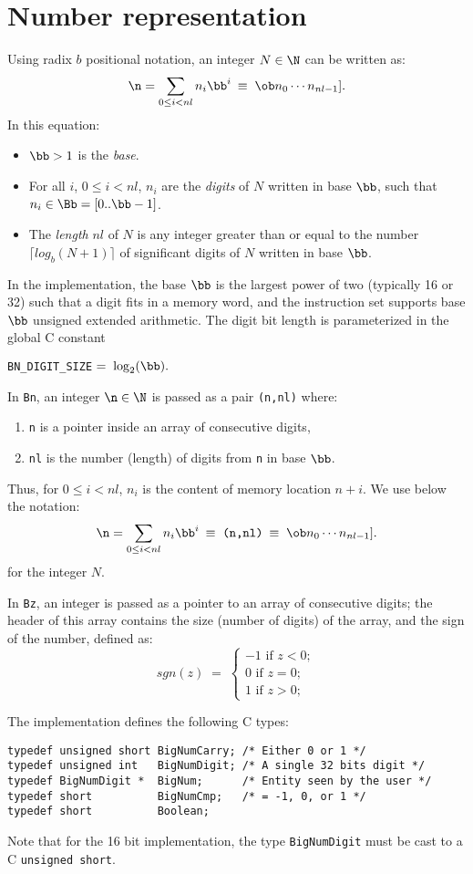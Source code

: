 \section{Number representation}
Using radix $b$ positional notation, an integer $N \in \N$ can be
written as:
$$ \n = \sum_{0 \leq i < nl} n_{i} \bb^i 
\: \equiv \; \ob n_0 \cdots n_{nl-1}].
$$
In this equation:
\begin{itemize}
  \item $\bb > 1$ is the {\em base}.
  \item For all $i$, $0 \leq i < nl$, $n_i$ are the {\em digits}
  of $N$ written in base $\bb$, such that $n_i \in \Bb= [0..\bb -1]$.
  \item The {\em length} $nl$ of $N$ is any integer greater than or
  equal to the number $\lceil log_b(N+1) \rceil$ of significant
  digits of $N$ written in base $\bb$.
\end{itemize}
In the implementation, the base $\bb$ is the largest power of two
(typically 16 or 32) such that a digit
fits in a memory word, and the  instruction set supports base $\bb$
unsigned extended arithmetic. The digit bit length is parameterized
in the global C constant 
\begin{center}
\verb+BN_DIGIT_SIZE+$ \; = \; \log_2(\bb).$
\end{center}
In \verb+Bn+, an integer $\n \in \N$ is passed as a
pair \verb+(n,nl)+ where:
\begin{enumerate}
  \item \verb+n+ is a pointer inside an array of consecutive digits,
  \item \verb+nl+ is the number (length) of digits from \verb+n+ in base $\bb$.
\end{enumerate}
Thus, for $0 \leq i < nl$, $n_i$ is the content of memory location
$n+i$. We use below the notation:
$$ \n = \sum_{0 \leq i < nl} n_{i} \bb^i \: \equiv \; \verb+(n,nl)+ 
\: \equiv \; \ob n_0 \cdots n_{nl-1}].
$$
for the integer $N$.

 In \verb+Bz+, an integer is passed as a  pointer to an array of
consecutive digits; the header of this array contains the size (number of
digits) of the array, and the sign of the  number, defined as:
$$
sgn(z) \; = \; \left\{ 
\begin{array}{r} -1 \mbox{ if } z<0; \\  0 \mbox{ if } z=0; \\  1 \mbox{ if } 
z>0; 
\end{array} \right. $$

\clearpage
The implementation defines the following C types:
\begin{verbatim}
typedef unsigned short BigNumCarry; /* Either 0 or 1 */
typedef unsigned int   BigNumDigit; /* A single 32 bits digit */
typedef BigNumDigit *  BigNum;      /* Entity seen by the user */
typedef short          BigNumCmp;   /* = -1, 0, or 1 */
typedef short          Boolean;
\end{verbatim}
Note that for the 16 bit implementation, the type \verb+BigNumDigit+ must
be cast to a C \verb+unsigned short+.

